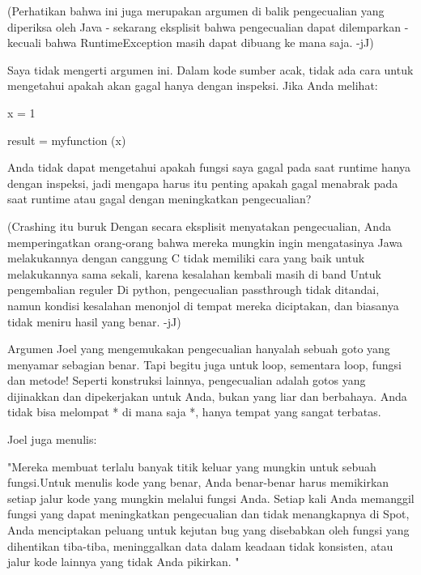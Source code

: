 \vspace{12pt}
(Perhatikan bahwa ini juga merupakan argumen di balik pengecualian yang diperiksa oleh Java - sekarang eksplisit bahwa pengecualian dapat dilemparkan - kecuali bahwa RuntimeException masih dapat dibuang ke mana saja. -jJ) \par
\vspace{12pt}
Saya tidak mengerti argumen ini. Dalam kode sumber acak, tidak ada cara untuk mengetahui apakah akan gagal hanya dengan inspeksi. Jika Anda melihat: \par
\vspace{12pt}
x = 1 \par
result = myfunction (x) \par
\vspace{12pt}
Anda tidak dapat mengetahui apakah fungsi saya gagal pada saat runtime hanya dengan inspeksi, jadi mengapa harus itu penting apakah gagal menabrak pada saat runtime atau gagal dengan meningkatkan pengecualian? \par
\vspace{12pt}
(Crashing itu buruk Dengan secara eksplisit menyatakan pengecualian, Anda memperingatkan orang-orang bahwa mereka mungkin ingin mengatasinya Jawa melakukannya dengan canggung C tidak memiliki cara yang baik untuk melakukannya sama sekali, karena kesalahan kembali masih di band Untuk pengembalian reguler Di python, pengecualian passthrough tidak ditandai, namun kondisi kesalahan menonjol di tempat mereka diciptakan, dan biasanya tidak meniru hasil yang benar. -jJ) \par
\vspace{12pt}
Argumen Joel yang mengemukakan pengecualian hanyalah sebuah goto yang menyamar sebagian benar. Tapi begitu juga untuk loop, sementara loop, fungsi dan metode! Seperti konstruksi lainnya, pengecualian adalah gotos yang dijinakkan dan dipekerjakan untuk Anda, bukan yang liar dan berbahaya. Anda tidak bisa melompat * di mana saja *, hanya tempat yang sangat terbatas. \par
\vspace{12pt}
Joel juga menulis: \par
\vspace{12pt}
"Mereka membuat terlalu banyak titik keluar yang mungkin untuk sebuah fungsi.Untuk menulis kode yang benar, Anda benar-benar harus memikirkan setiap jalur kode yang mungkin melalui fungsi Anda. Setiap kali Anda memanggil fungsi yang dapat meningkatkan pengecualian dan tidak menangkapnya di Spot, Anda menciptakan peluang untuk kejutan bug yang disebabkan oleh fungsi yang dihentikan tiba-tiba, meninggalkan data dalam keadaan tidak konsisten, atau jalur kode lainnya yang tidak Anda pikirkan. " \par
\vspace{12pt}
\vspace{12pt}
\vspace{12pt}
